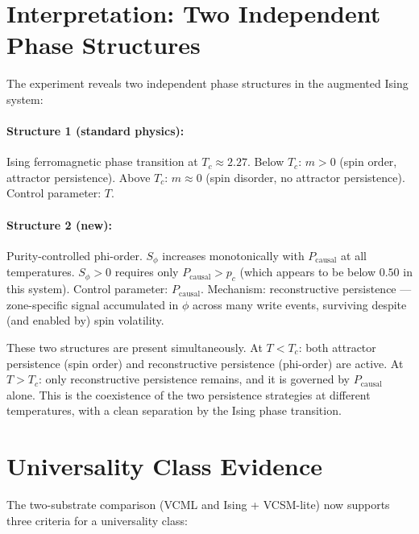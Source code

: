\documentclass[11pt,a4paper]{article}
\begin{document}
\section{Interpretation: Two Independent Phase Structures}

The experiment reveals two independent phase structures in the augmented Ising system:

\paragraph{Structure 1 (standard physics):}
Ising ferromagnetic phase transition at $T_c \approx 2.27$.
Below $T_c$: $m > 0$ (spin order, attractor persistence).
Above $T_c$: $m \approx 0$ (spin disorder, no attractor persistence).
Control parameter: $T$.

\paragraph{Structure 2 (new):}
Purity-controlled phi-order.
$S_\phi$ increases monotonically with $P_\mathrm{causal}$ at all temperatures.
$S_\phi > 0$ requires only $P_\mathrm{causal} > p_c$ (which appears to be
below $0.50$ in this system).
Control parameter: $P_\mathrm{causal}$.
Mechanism: reconstructive persistence --- zone-specific signal accumulated in $\phi$
across many write events, surviving despite (and enabled by) spin volatility.

These two structures are present simultaneously.
At $T < T_c$: both attractor persistence (spin order) and reconstructive
persistence (phi-order) are active.
At $T > T_c$: only reconstructive persistence remains, and it is governed
by $P_\mathrm{causal}$ alone.
This is the coexistence of the two persistence strategies at different temperatures,
with a clean separation by the Ising phase transition.

\section{Universality Class Evidence}

The two-substrate comparison (VCML and Ising + VCSM-lite) now supports
three criteria for a universality class:
\end{document}
